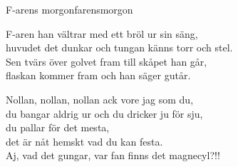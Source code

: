\begin{song}{F-arens morgon}{farensmorgon}
\begin{vers}
F-aren han vältrar med ett bröl ur sin säng,\\
huvudet det dunkar och tungan känns torr och stel.\\
Sen tvärs över golvet fram till skåpet han går,\\
flaskan kommer fram och han säger gutår.\\
\end{vers}
\begin{vers}
Nollan, nollan, nollan ack vore jag som du,\\
du bangar aldrig ur och du dricker ju för sju,\\
du pallar för det mesta,\\
det är nåt hemskt vad du kan festa.\\
Aj, vad det gungar, var fan finns det magnecyl?!!\\
\end{vers}
\end{song}

